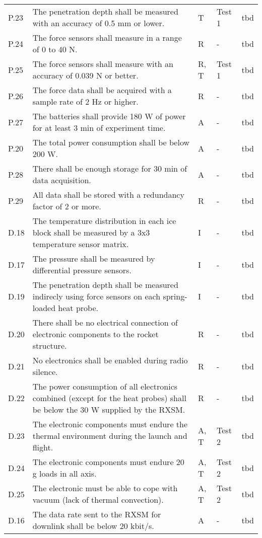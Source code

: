 \documentclass[11pt]{scrartcl}
\begin{document}
\begin{center}
\begin{longtable}{| p{} | p{} | p{} | p{} | p{} |}
		P.23 & The penetration depth shall be measured with an accuracy of 0.5 mm or lower. & T & Test 1 & tbd \\
		P.24 & The force sensors shall measure in a range of 0 to 40 N. & R & - & tbd \\
		P.25 & The force sensors shall measure with an accuracy of 0.039 N or better. & R, T & Test 1 & tbd \\
		P.26 & The force data shall be acquired with a sample rate of 2 Hz or higher. & R & - & tbd \\
		P.27 & The batteries shall provide 180 W of power for at least 3 min of experiment time. & A & - & tbd \\
		P.20 & The total power consumption shall be below 200 W. & A & - & tbd \\
		P.28 & There shall be enough storage for 30 min of data acquisition. & A & - & tbd \\
		P.29 & All data shall be stored with a redundancy factor of 2 or more. & R & - & tbd \\
		\hline
		D.18 & The temperature distribution in each ice block shall be measured by a 3x3 temperature sensor matrix. & I & - & tbd \\
		D.17 & The pressure shall be measured by differential pressure sensors. & I & - & tbd \\
		D.19 & The penetration depth shall be measured indirecly using force sensors on each spring-loaded heat probe. & I & - & tbd \\
		D.20 & There shall be no electrical connection of electronic components to the rocket structure. & R & - & tbd \\
		D.21 & No electronics shall be enabled during radio silence. & R & - & tbd \\
		D.22 & The power consumption of all electronics combined (except for the heat probes) shall be below the 30 W supplied by the RXSM. & R & - & tbd \\
		D.23 & The electronic components must endure the thermal environment during the launch and flight. & A, T & Test 2 & tbd \\
		D.24 & The electronic components must endure 20 g loads in all axis. & A, T & Test 2 & tbd \\
		D.25 & The electronic must be able to cope with vacuum (lack of thermal convection). & A, T & Test 2 & tbd \\
		D.16 & The data rate sent to the RXSM for downlink shall be below 20 kbit/s. & A & - & tbd \\
		

\end{longtable}
\end{center}
\end{document}
